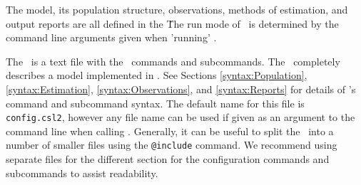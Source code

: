 The model, its population structure, observations, methods of estimation, and output reports are all defined in the \config\. The run mode of \CNAME\ is determined by the command line arguments given when 'running' \CNAME.

The \config\ is a text file with the \CNAME\ commands and subcommands. The \config\ completely describes a model implemented in \CNAME. See Sections \ref{syntax:Population}, \ref{syntax:Estimation}, \ref{syntax:Observations}, and \ref{syntax:Reports} for details of \CNAME's command and subcommand syntax.  The default name for this file is \texttt{config.csl2}, however any file name can be used if given as an argument to the command line when calling \CNAME. Generally, it can be useful to split the \config\ into a number of smaller files using the \texttt{@include} command. We recommend using separate files for the different section for the configuration commands and subcommands to assist readability.
